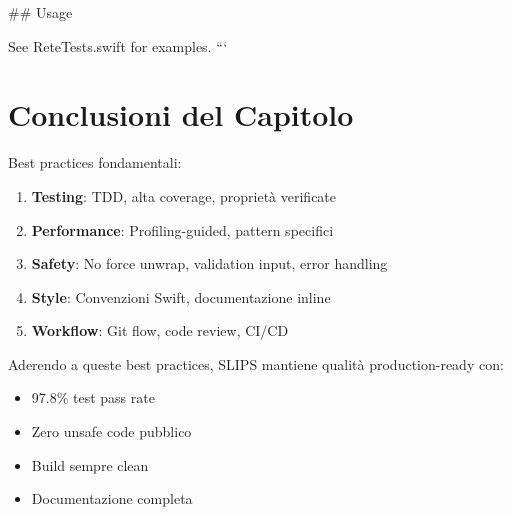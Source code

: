 ## Usage

See ReteTests.swift for examples.
```

\section{Conclusioni del Capitolo}

Best practices fondamentali:

\begin{enumerate}
\item \textbf{Testing}: TDD, alta coverage, proprietà verificate
\item \textbf{Performance}: Profiling-guided, pattern specifici
\item \textbf{Safety}: No force unwrap, validation input, error handling
\item \textbf{Style}: Convenzioni Swift, documentazione inline
\item \textbf{Workflow}: Git flow, code review, CI/CD
\end{enumerate}

\begin{successbox}
Aderendo a queste best practices, SLIPS mantiene qualità production-ready con:
\begin{itemize}
\item 97.8\% test pass rate
\item Zero unsafe code pubblico
\item Build sempre clean
\item Documentazione completa
\end{itemize}
\end{successbox}

